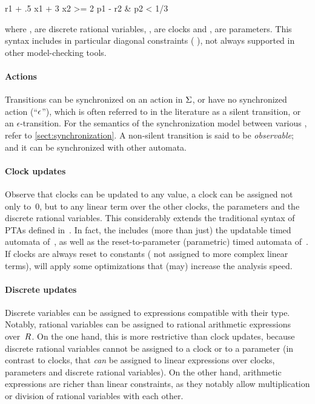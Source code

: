 \begin{IMITATORmodel}
r1 + .5 x1 + 3 x2 >= 2 p1 - r2 & p2 < 1/3
\end{IMITATORmodel}

\noindent{}where ,  are discrete rational variables, ,  are clocks and ,  are parameters.
This syntax includes in particular diagonal constraints (\eg{} ), not always supported in other model-checking tools.

\paragraph{Actions}
Transitions can be synchronized on an action in $\Sigma$, or have no synchronized action (``$\epsilon$''), which is often referred to in the literature as a silent transition, or an $\epsilon$-transition.
For the semantics of the synchronization model between various \IPTA{}, refer to \cref{sect:synchronization}.
A non-silent transition is said to be \emph{observable}; and it can be synchronized with other automata.

\paragraph{Clock updates}
Observe that clocks can be updated to any value, \ie{} a clock can be assigned not only to~0, but to any linear term over the other clocks, the parameters and the discrete rational variables.
This considerably extends the traditional syntax of PTAs defined in~\cite{AHV93}.
In fact, the \imitator{} includes (more than just) the updatable timed automata of~\cite{BDFP04}, as well as the reset-to-parameter (parametric) timed automata of~\cite{ALR18PresetTA}.
If clocks are always reset to constants (\ie{} not assigned to more complex linear terms), \imitator{} will apply some optimizations that (may) increase the analysis speed.

\paragraph{Discrete updates}
Discrete variables can be assigned to expressions compatible with their type.
Notably, rational variables can be assigned to rational arithmetic expressions over~$R$.
On the one hand, this is more restrictive than clock updates, because discrete rational variables cannot be assigned to a clock or to a parameter (in contrast to clocks, that \emph{can} be assigned to linear expressions over clocks, parameters and discrete rational variables).
On the other hand, arithmetic expressions are richer than linear constraints, as they notably allow multiplication or division of rational variables with each other.

